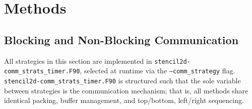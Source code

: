\documentclass{article}
\begin{document}
\section{Methods}
\label{sec:methods}

\subsection{Blocking and Non-Blocking Communication}
\label{sec:strategies}

All strategies in this section are implemented in
\texttt{stencil2d-comm\_strats\_timer.F90}, selected at runtime via the
\texttt{--comm\_strategy} flag. \texttt{stencil2d-comm\_strats\_timer.F90} is structured such that the sole variable between strategies is the communication mechanism; that is, all methods share identical packing, buffer management, and top/bottom, left/right sequencing.
\end{document}
